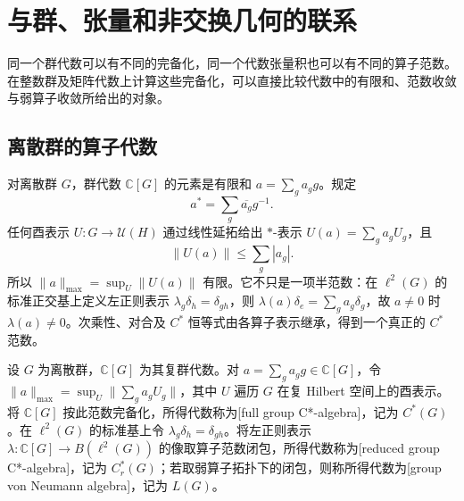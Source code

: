 

\section{与群、张量和非交换几何的联系}
\label{b2:sec:D05}

同一个群代数可以有不同的完备化，同一个代数张量积也可以有不同的算子范数。在整数群及矩阵代数上计算这些完备化，可以直接比较代数中的有限和、范数收敛与弱算子收敛所给出的对象。

\subsection{离散群的算子代数}
\label{b2:subsec:D05:01}

对离散群 \(G\)，群代数 \(\mathbb C[G]\) 的元素是有限和 \(a=\sum_g a_g g\)。规定
\[
	a^*=\sum_g\overline{a_g}g^{-1}.
\]
任何酉表示 \(U:G\to\mathcal U(H)\) 通过线性延拓给出 \(*\)-表示 \(U(a)=\sum_g a_g U_g\)，且
\[
	\bigl\|U(a)\bigr\|\le\sum_g|a_g|.
\]
所以 \(\|a\|_{\max}=\sup_U\bigl\lVert U(a)\bigr\rVert\) 有限。它不只是一项半范数：在 \(\ell^2(G)\) 的标准正交基上定义左正则表示 \(\lambda_g\delta_h=\delta_{gh}\)，则 \(\lambda(a)\delta_e=\sum_g a_g\delta_g\)，故 \(a\ne0\) 时 \(\lambda(a)\ne0\)。次乘性、对合及 \(C^*\) 恒等式由各算子表示继承，得到一个真正的 \(C^*\) 范数。

\begin{definition}\label{b2:def:group-operator-algebras}
	设 \(G\) 为离散群，\(\mathbb C[G]\) 为其复群代数。对 \(a=\sum_g a_g g\in\mathbb C[G]\)，令 \(\|a\|_{\max}=\sup_U\|\sum_g a_gU_g\|\)，其中 \(U\) 遍历 \(G\) 在复 Hilbert 空间上的酉表示。将 \(\mathbb C[G]\) 按此范数完备化，所得代数称为[full group C*-algebra]，记为 \(C^*(G)\)。在 \(\ell^2(G)\) 的标准基上令 \(\lambda_g\delta_h=\delta_{gh}\)。将左正则表示 \(\lambda:\mathbb C[G]\to B(\ell^2(G))\) 的像取算子范数闭包，所得代数称为[reduced group C*-algebra]，记为 \(C_r^*(G)\)；若取弱算子拓扑下的闭包，则称所得代数为[group von Neumann algebra]，记为 \(L(G)\)。
\end{definition}

